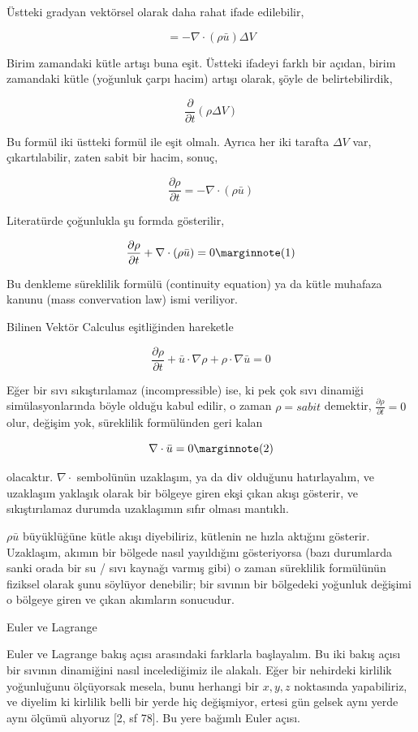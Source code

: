 \documentclass[12pt,fleqn]{article}\usepackage{../../common}
\begin{document}
Üstteki gradyan vektörsel olarak daha rahat ifade edilebilir,

$$
= -\nabla \cdot (\rho \bar{u} ) \Delta V
$$

Birim zamandaki kütle artışı buna eşit. Üstteki ifadeyi farklı bir açıdan, birim
zamandaki kütle (yoğunluk çarpı hacim) artışı olarak, şöyle de belirtebilirdik,

$$
\frac{\partial }{\partial t} (\rho \Delta V) 
$$

Bu formül iki üstteki formül ile eşit olmalı. Ayrıca her iki tarafta $\Delta V$
var, çıkartılabilir, zaten sabit bir hacim, sonuç,

$$
\frac{\partial \rho}{\partial t}  = -\nabla \cdot (\rho \bar{u} )
$$

Literatürde çoğunlukla şu formda gösterilir,

$$
\frac{\partial \rho}{\partial t}  + \nabla \cdot (\rho \bar{u} ) = 0
\mlabel{1}
$$

Bu denkleme süreklilik formülü (continuity equation) ya da kütle muhafaza kanunu
(mass convervation law) ismi veriliyor.

Bilinen Vektör Calculus eşitliğinden hareketle

$$
\frac{\partial \rho}{\partial t}  +
\bar{u} \cdot \nabla \rho +
\rho \cdot \nabla \bar{u} = 0
$$

Eğer bir sıvı sıkıştırılamaz (incompressible) ise, ki pek çok sıvı dinamiği
simülasyonlarında böyle olduğu kabul edilir, o zaman $\rho = sabit$ demektir,
$\frac{\partial \rho}{\partial t} = 0 $ olur, değişim yok, süreklilik
formülünden geri kalan

$$
\nabla \cdot \bar{u} = 0
\mlabel{2}
$$

olacaktır. $\nabla \cdot$ sembolünün uzaklaşım, ya da $\operatorname{div}$ olduğunu
hatırlayalım, ve uzaklaşım yaklaşık olarak bir bölgeye giren ekşi çıkan akışı
gösterir, ve sıkıştırılamaz durumda uzaklaşımın sıfır olması mantıklı.

$\rho \bar{u}$ büyüklüğüne kütle akışı diyebiliriz, kütlenin ne hızla aktığını
gösterir. Uzaklaşım, akımın bir bölgede nasıl yayıldığını gösteriyorsa (bazı
durumlarda sanki orada bir su / sıvı kaynağı varmış gibi) o zaman süreklilik
formülünün fiziksel olarak şunu söylüyor denebilir; bir sıvının bir bölgedeki
yoğunluk değişimi o bölgeye giren ve çıkan akımların sonucudur.

Euler ve Lagrange

Euler ve Lagrange bakış açısı arasındaki farklarla başlayalım. Bu iki bakış
açısı bir sıvının dinamiğini nasıl incelediğimiz ile alakalı. Eğer bir nehirdeki
kirlilik yoğunluğunu ölçüyorsak mesela, bunu herhangi bir $x,y,z$ noktasında
yapabiliriz, ve diyelim ki kirlilik belli bir yerde hiç değişmiyor, ertesi gün
gelsek aynı yerde aynı ölçümü alıyoruz [2, sf 78]. Bu yere bağımlı Euler açısı.
\end{document}
